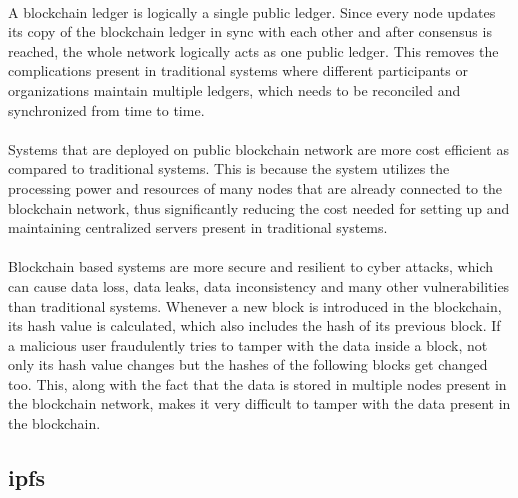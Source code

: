 \documentclass[12pt]{article}
\begin{document}
        \paragraph{}
        A blockchain ledger is logically a single public ledger. Since every node updates its copy of the blockchain ledger in sync with each other and after consensus is reached, the whole network logically acts as one public ledger. This removes the complications present in traditional systems where different participants or organizations maintain multiple ledgers, which needs to be reconciled and synchronized from time to time.

        \paragraph{}
        Systems that are deployed on public blockchain network are more cost efficient as compared to traditional systems. This is because the system utilizes the processing power and resources of many nodes that are already connected to the blockchain network, thus significantly reducing the cost needed for setting up and maintaining centralized servers present in traditional systems.

        \paragraph{}
        Blockchain based systems are more secure and resilient to cyber attacks, which can cause data loss, data leaks, data inconsistency and many other vulnerabilities than traditional systems. Whenever a new block is introduced in the blockchain, its hash value is calculated, which also includes the hash of its previous block. If a malicious user fraudulently tries to tamper with the data inside a block, not only its hash value changes but the hashes of the following blocks get changed too. This, along with the fact that the data is stored in multiple nodes present in the blockchain network, makes it very difficult to tamper with the data present in the blockchain.
        
        \paragraph{}

    \subsection{\acrshort{ipfs}}
\end{document}
